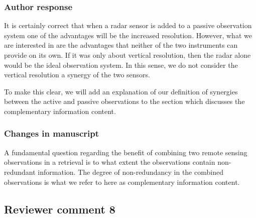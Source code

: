 \subsubsection*{Author response}

It is certainly correct that when a radar sensor is added to a passive
observation system one of the advantages will be the increased resolution.
However, what we are interested in are the advantages that neither of the two
instruments can provide on its own. If it was only about vertical resolution,
then the radar alone would be the ideal observation system. In this sense, we do
not consider the vertical resolution a synergy of the two sensors.

To make this clear, we will add an explanation of our definition of synergies
between the active and passive observations to the section which discusses the
complementary information content.

\subsubsection*{Changes in manuscript}
\begin{change}[237]
A fundamental question regarding the benefit of combining two remote sensing
observations in a retrieval is to what extent the observations contain
non-redundant information. The degree of non-redundancy in the combined
observations is what we refer to here as complementary information content. \DIFaddbegin {}
\end{change}



\subsection*{Reviewer comment 8}

